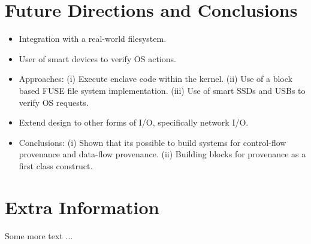 \documentclass[withindex,glossary]{cam-thesis}
\begin{document}
\chapter{Future Directions and Conclusions}
\begin{itemize}
\item Integration with a real-world filesystem.
\item User of smart devices to verify OS actions.
\item Approaches:
(i) Execute enclave code within the kernel.
(ii) Use of a block based FUSE file system implementation.
(iii) Use of smart SSDs and USBs to verify OS requests.
\item Extend design to other forms of I/O, specifically network I/O.

\item Conclusions: 
(i) Shown that its possible to build systems for control-flow provenance and data-flow provenance.
(ii) Building blocks for provenance as a first class construct.
\end{itemize}




\cleardoublepage
{}
{}






\appendix

\chapter{Extra Information}
Some more text ...



\printthesisindex
\end{document}
